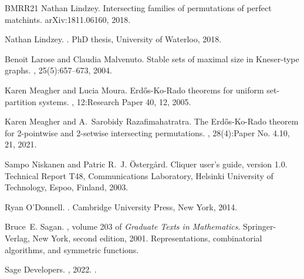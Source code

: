 \documentclass[10pt,a4paper]{article}
\theoremstyle{definition}
\begin{document}
\begin{thebibliography}{BMRR21}
Nathan Lindzey.
\newblock Intersecting families of permutations of perfect matchints.
\newblock arXiv:1811.06160, 2018.

Nathan Lindzey.
.
\newblock PhD thesis, University of Waterloo, 2018.

Benoit Larose and Claudia Malvenuto.
\newblock Stable sets of maximal size in {K}neser-type graphs.
, 25(5):657--673, 2004.

Karen Meagher and Lucia Moura.
\newblock Erd{\H{o}}s-{K}o-{R}ado theorems for uniform set-partition systems.
, 12:Research Paper 40, 12, 2005.

Karen Meagher and A.~Sarobidy Razafimahatratra.
\newblock The {E}rd{\H{o}}s-{K}o-{R}ado theorem for 2-pointwise and 2-setwise
  intersecting permutations.
, 28(4):Paper No. 4.10, 21, 2021.

Sampo Niskanen and Patric R.~J. {\"O}sterg{\aa}rd.
\newblock Cliquer user's guide, version 1.0.
\newblock Technical Report T48, Communications Laboratory, Helsinki University
  of Technology, Espoo, Finland, 2003.

Ryan O'Donnell.
.
\newblock Cambridge University Press, New York, 2014.

Bruce~E. Sagan.
, volume 203 of {\em Graduate Texts in
  Mathematics}.
\newblock Springer-Verlag, New York, second edition, 2001.
\newblock Representations, combinatorial algorithms, and symmetric functions.

{Sage Developers}.
, 2022.
.

\end{thebibliography}
\end{document}
